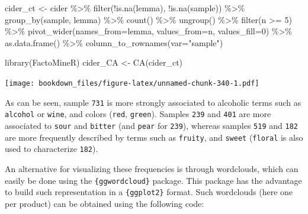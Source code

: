 \documentclass[
]{krantz}
\makeatletter
\newenvironment{Shaded}{\begin{snugshade}}{\end{snugshade}}
\newcommand{\AttributeTok}[1]{\textcolor[rgb]{0.61,0.61,0.61}{#1}}
\newcommand{\DecValTok}[1]{\textcolor[rgb]{0.06,0.06,0.06}{#1}}
\newcommand{\FunctionTok}[1]{\textcolor[rgb]{0,0,0}{#1}}
\newcommand{\NormalTok}[1]{#1}
\newcommand{\OtherTok}[1]{\textcolor[rgb]{0.37,0.37,0.37}{#1}}
\newcommand{\SpecialCharTok}[1]{\textcolor[rgb]{0,0,0}{#1}}
\newcommand{\StringTok}[1]{\textcolor[rgb]{0.5,0.5,0.5}{#1}}
\newenvironment{kframe}{%
\medskip{}
\setlength{\fboxsep}{.8em}
 \def\at@end@of@kframe{}%
 \ifinner\ifhmode%
  \def\at@end@of@kframe{\end{minipage}}%
  \begin{minipage}{\columnwidth}%
 \fi\fi%
 \def\FrameCommand##1{\hskip\@totalleftmargin \hskip-\fboxsep
 \colorbox{shadecolor}{##1}\hskip-\fboxsep
     \hskip-\linewidth \hskip-\@totalleftmargin \hskip\columnwidth}%
 \MakeFramed {\advance\hsize-\width
   \@totalleftmargin\z@ \linewidth\hsize
   \@setminipage}}%
 {\par\unskip\endMakeFramed%
 \at@end@of@kframe}
\renewenvironment{Shaded}{\begin{kframe}}{\end{kframe}}
\makeatother
\begin{document}
\begin{Shaded}
\begin{Highlighting}[]
\NormalTok{cider\_ct }\OtherTok{\textless{}{-}}\NormalTok{ cider }\SpecialCharTok{\%\textgreater{}\%} 
  \FunctionTok{filter}\NormalTok{(}\SpecialCharTok{!}\FunctionTok{is.na}\NormalTok{(lemma), }\SpecialCharTok{!}\FunctionTok{is.na}\NormalTok{(sample)) }\SpecialCharTok{\%\textgreater{}\%} 
  \FunctionTok{group\_by}\NormalTok{(sample, lemma) }\SpecialCharTok{\%\textgreater{}\%} 
  \FunctionTok{count}\NormalTok{() }\SpecialCharTok{\%\textgreater{}\%} 
  \FunctionTok{ungroup}\NormalTok{() }\SpecialCharTok{\%\textgreater{}\%} 
  \FunctionTok{filter}\NormalTok{(n }\SpecialCharTok{\textgreater{}=} \DecValTok{5}\NormalTok{) }\SpecialCharTok{\%\textgreater{}\%} 
  \FunctionTok{pivot\_wider}\NormalTok{(}\AttributeTok{names\_from=}\NormalTok{lemma, }\AttributeTok{values\_from=}\NormalTok{n, }\AttributeTok{values\_fill=}\DecValTok{0}\NormalTok{) }\SpecialCharTok{\%\textgreater{}\%} 
  \FunctionTok{as.data.frame}\NormalTok{() }\SpecialCharTok{\%\textgreater{}\%} 
  \FunctionTok{column\_to\_rownames}\NormalTok{(}\AttributeTok{var=}\StringTok{"sample"}\NormalTok{)}

\FunctionTok{library}\NormalTok{(FactoMineR)}
\NormalTok{cider\_CA }\OtherTok{\textless{}{-}} \FunctionTok{CA}\NormalTok{(cider\_ct)}
\end{Highlighting}
\end{Shaded}

\texttt{[image: bookdown\_files/figure-latex/unnamed-chunk-340-1.pdf]}

As can be seen, sample \texttt{731} is more strongly associated to alcoholic terms such as \texttt{alcohol} or \texttt{wine}, and colors (\texttt{red}, \texttt{green}). Samples \texttt{239} and \texttt{401} are more associated to \texttt{sour} and \texttt{bitter} (and \texttt{pear} for \texttt{239}), whereas samples \texttt{519} and \texttt{182} are more frequently described by terms such as \texttt{fruity}, and \texttt{sweet} (\texttt{floral} is also used to characterize \texttt{182}).

An alternative for visualizing these frequencies is through wordclouds, which can easily be done using the \texttt{\{ggwordcloud\}} package. This package has the advantage to build such representation in a \texttt{\{ggplot2\}} format. Such wordclouds (here one per product) can be obtained using the following code:
\end{document}
